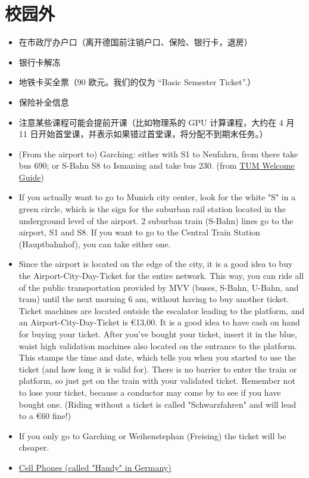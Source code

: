 
\section{校园外}
\begin{itemize}
  \item 在市政厅办户口（离开德国前注销户口、保险、银行卡，退房）
  \item 银行卡解冻
  \item 地铁卡买全票（90 欧元。我们的仅为 ``Basic Semester Ticket''.）
  \item 保险补全信息
  \item 注意某些课程可能会提前开课（比如物理系的 GPU 计算课程，大约在 4 月 11 日开始首堂课，并表示如果错过首堂课，将分配不到期末任务。）
  \item (From the airport to) {\color{blue}Garching}: either with S1 to Neufahrn, from there take bus 690; or S-Bahn S8 to Ismaning and take bus 230. (from \href{https://distributed-campus.org/tumwelcomeguide/portal/media-type/html/language/en/role/student/page/default.psml/js_panename/DCContentObjectAusgabe/language/en/idgroup/19/id/96/typ/text}{TUM Welcome Guide})
  \item If you actually want to go to {\color{blue}Munich city center}, look for the white "S" in a green circle, which is the sign for the suburban rail station located in the underground level of the airport. 2 suburban train (S-Bahn) lines go to the airport, {\color{blue}S1 and S8}. If you want to go to the Central Train Station (Hauptbahnhof), you can take either one.
  \item Since the airport is located on the edge of the city, it is a good idea to buy the {\color{blue}Airport-City-Day-Ticket} for the entire network. This way, you can ride all of the public transportation provided by MVV (buses, S-Bahn, U-Bahn, and tram) until the next morning 6 am, without having to buy another ticket. Ticket machines are located outside the escalator leading to the platform, and an Airport-City-Day-Ticket is \euro{13,00}. It is a good idea to have cash on hand for buying your ticket. After you've bought your ticket, insert it in the blue, waist high validation machines also located on the entrance to the platform. This stamps the time and date, which tells you when you started to use the ticket (and how long it is valid for). There is no barrier to enter the train or platform, so just get on the train with your validated ticket. Remember not to lose your ticket, because a conductor may come by to see if you have bought one. (Riding without a ticket is called "Schwarzfahren" and will lead to a \euro{60} fine!)
  \item If you only go to Garching or Weihenstephan (Freising) the ticket will be cheaper.
  \item \href{https://distributed-campus.org/tumwelcomeguide/portal/media-type/html/language/en/role/student/page/default.psml/js_panename/DCContentObjectAusgabe/language/en/idgroup/19/id/111/typ/text}{Cell Phones (called "Handy" in Germany)}
\end{itemize}

